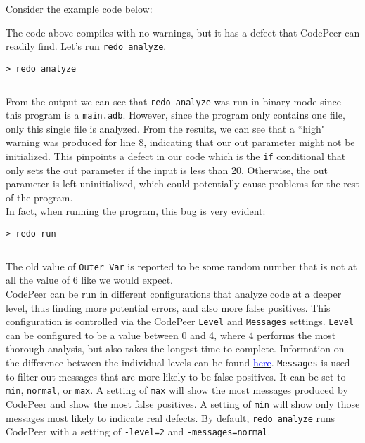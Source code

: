 Consider the example code below:


The code above compiles with no warnings, but it has a defect that CodePeer can readily find. Let's run \texttt{redo analyze}.

\vspace{5mm} %
\begin{verbatim}
> redo analyze
\end{verbatim}
\inputminted{text}{../example_architecture/analyze_demo/output.txt}
\vspace{5mm} %

From the output we can see that \texttt{redo analyze} was run in binary mode since this program is a \texttt{main.adb}. However, since the program only contains one file, only this single file is analyzed. From the results, we can see that a ``high" warning was produced for line 8, indicating that our out parameter might not be initialized. This pinpoints a defect in our code which is the \texttt{if} conditional that only sets the out parameter if the input is less than 20. Otherwise, the out parameter is left uninitialized, which could potentially cause problems for the rest of the program. \\

In fact, when running the program, this bug is very evident:

\vspace{5mm} %
\begin{verbatim}
> redo run 
\end{verbatim}
\inputminted{text}{../example_architecture/analyze_demo/output2.txt}
\vspace{5mm} %

The old value of \texttt{Outer\_Var} is reported to be some random number that is not at all the value of 6 like we would expect. \\

CodePeer can be run in different configurations that analyze code at a deeper level, thus finding more potential errors, and also more false positives. This configuration is controlled via the CodePeer \texttt{Level} and \texttt{Messages} settings. \texttt{Level} can be configured to be a value between 0 and 4, where 4 performs the most thorough analysis, but also takes the longest time to complete. Information on the difference between the individual levels can be found \href{https://docs.adacore.com/codepeer-docs/users_guide/_build/html/running.html#codepeer-levels}{\textcolor{blue}{here}}. \texttt{Messages} is used to filter out messages that are more likely to be false positives. It can be set to \texttt{min}, \texttt{normal}, or \texttt{max}. A setting of \texttt{max} will show the most messages produced by CodePeer and show the most false positives. A setting of \texttt{min} will show only those messages most likely to indicate real defects. By default, \texttt{redo analyze} runs CodePeer with a setting of \texttt{-level=2} and \texttt{-messages=normal}. \\

